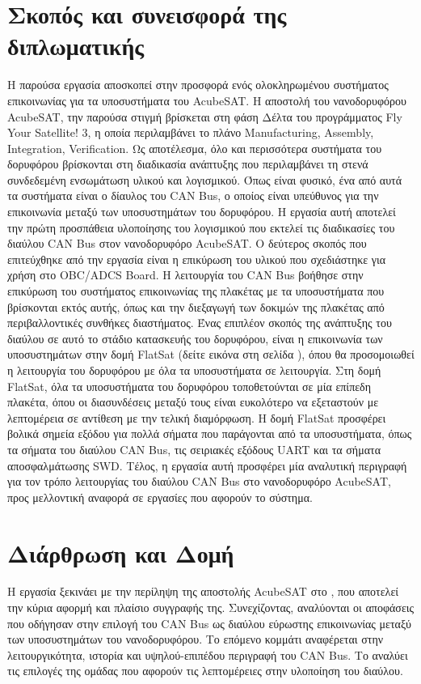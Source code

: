 \documentclass[a4paper,nobib,justified]{tufte-book}
\begin{document}
\section{Σκοπός και συνεισφορά της διπλωματικής}
Η παρούσα εργασία αποσκοπεί στην προσφορά ενός ολοκληρωμένου συστήματος επικοινωνίας για τα υποσυστήματα του AcubeSAT. Η αποστολή του νανοδορυφόρου AcubeSAT, την παρούσα στιγμή βρίσκεται στη φάση Δέλτα του προγράμματος Fly Your Satellite! 3, η οποία περιλαμβάνει το πλάνο Manufacturing, Assembly, Integration, Verification. Ως αποτέλεσμα, όλο και περισσότερα συστήματα του δορυφόρου βρίσκονται στη διαδικασία ανάπτυξης που περιλαμβάνει τη στενά συνδεδεμένη ενσωμάτωση υλικού και λογισμικού. Όπως είναι φυσικό, ένα από αυτά τα συστήματα είναι ο δίαυλος του CAN Bus, ο οποίος είναι υπεύθυνος για την επικοινωνία μεταξύ των υποσυστημάτων του δορυφόρου.  Η εργασία αυτή αποτελεί την πρώτη προσπάθεια υλοποίησης του λογισμικού που εκτελεί τις διαδικασίες του διαύλου CAN Bus στον νανοδορυφόρο AcubeSAT. Ο δεύτερος σκοπός που επιτεύχθηκε από την εργασία είναι η επικύρωση του υλικού που σχεδιάστηκε για χρήση στο OBC/ADCS Board. Η λειτουργία του CAN Bus βοήθησε στην επικύρωση του συστήματος επικοινωνίας της πλακέτας με τα υποσυστήματα που βρίσκονται εκτός αυτής, όπως και την διεξαγωγή των δοκιμών της πλακέτας από περιβαλλοντικές συνθήκες διαστήματος. Ένας επιπλέον σκοπός της ανάπτυξης του διαύλου σε αυτό το στάδιο κατασκευής του δορυφόρου, είναι η επικοινωνία των υποσυστημάτων στην δομή FlatSat (δείτε εικόνα στη σελίδα ), όπου θα προσομοιωθεί η λειτουργία του δορυφόρου με όλα τα υποσυστήματα σε λειτουργία. Στη δομή FlatSat, όλα τα υποσυστήματα του δορυφόρου τοποθετούνται σε μία επίπεδη πλακέτα, όπου οι διασυνδέσεις μεταξύ τους είναι ευκολότερο να εξεταστούν με λεπτομέρεια σε αντίθεση με την τελική διαμόρφωση. Η δομή FlatSat προσφέρει βολικά σημεία εξόδου για πολλά σήματα που παράγονται από τα υποσυστήματα, όπως τα σήματα του διαύλου CAN Bus, τις σειριακές εξόδους UART και τα σήματα αποσφαλμάτωσης SWD. Τέλος, η εργασία αυτή προσφέρει μία αναλυτική περιγραφή για τον τρόπο λειτουργίας του διαύλου CAN Bus στο νανοδορυφόρο AcubeSAT, προς μελλοντική αναφορά σε εργασίες που αφορούν το σύστημα.

\section{Διάρθρωση και Δομή}
Η εργασία ξεκινάει με την περίληψη της αποστολής AcubeSAT στο , που αποτελεί την κύρια αφορμή και πλαίσιο συγγραφής της. Συνεχίζοντας, αναλύονται οι αποφάσεις που οδήγησαν στην επιλογή του CAN Bus ως διαύλου εύρωστης επικοινωνίας μεταξύ των υποσυστημάτων του νανοδορυφόρου. Το επόμενο κομμάτι αναφέρεται στην λειτουργικότητα, ιστορία και υψηλού-επιπέδου περιγραφή του CAN Bus. Το  αναλύει τις επιλογές της ομάδας που αφορούν τις λεπτομέρειες στην υλοποίηση του διαύλου.
\end{document}
